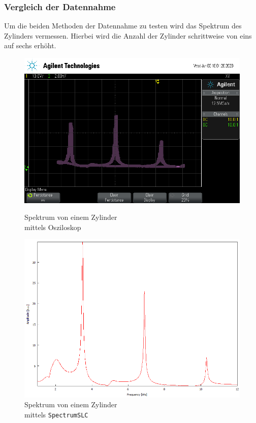 \subsubsection{Vergleich der Datennahme}
Um die beiden Methoden der Datennahme zu testen wird das Spektrum des Zylinders vermessen.
Hierbei wird die Anzahl der Zylinder schrittweise von eins auf sechs erhöht.
\FloatBarrier
\begin{figure}
    \begin{minipage}[b]{.4\linewidth} %
        \includegraphics[width=\linewidth]{figure/1Zylinder.png}
        \vspace*{0.008cm}
        \caption{Spektrum von einem Zylinder\\ mittels Osziloskop}
     \end{minipage}
     \hspace{.1\linewidth}%
     \begin{minipage}[b]{.4\linewidth} %
        \includegraphics[width=\linewidth]{figure/1_Zylinder.png}
        \caption{Spektrum von einem Zylinder\\ mittels \texttt{SpectrumSLC}}
     \end{minipage}
\end{figure}
